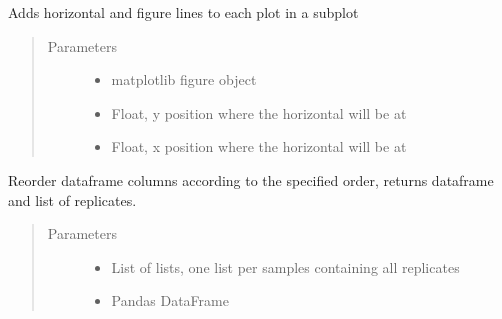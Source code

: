 \documentclass[letterpaper,10pt,english]{sphinxmanual}
\begin{document}

\begin{fulllineitems}
\label{\detokenize{platelib:platelib.plateread.add_lines}}
Adds horizontal and figure lines to each plot in a subplot
\begin{quote}\begin{description}
\item[{Parameters}] \leavevmode\begin{itemize}
\item {} 
 \textendash{} matplotlib figure object

\item {} 
 \textendash{} Float, y position where the horizontal will be at

\item {} 
 \textendash{} Float, x position where the horizontal will be at

\end{itemize}

\end{description}\end{quote}

\end{fulllineitems}


\begin{fulllineitems}
\label{\detokenize{platelib:platelib.plateread.named_order}}
Reorder dataframe columns according to the specified order, returns dataframe and list of replicates.
\begin{quote}\begin{description}
\item[{Parameters}] \leavevmode\begin{itemize}
\item {} 
 \textendash{} List of lists, one list per samples containing all replicates

\item {} 
 \textendash{} Pandas DataFrame

\end{itemize}

\end{description}\end{quote}

\end{fulllineitems}
\end{document}
